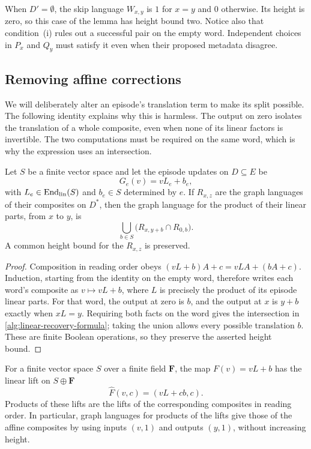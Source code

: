 When $D'=\emptyset$, the skip language $W_{x,y}$ is $1$ for $x=y$
and $0$ otherwise. Its height is zero, so this case of the lemma has
height bound two. Notice also that condition~\textup{(i)} rules out a
successful pair on the empty word. Independent choices in $P_x$ and
$Q_y$ must satisfy it even when their proposed metadata disagree.

\subsection{Removing affine corrections}

We will deliberately alter an episode's translation term to make its
split possible. The following identity explains why this is harmless.
The output on zero isolates the translation of a whole composite, even
when none of its linear factors is invertible. The two computations must
be required on the same word, which is why the expression uses an
intersection.

\begin{lemma}\label{alg:affine-recovery}
Let $S$ be a finite vector space and let the episode updates on
$D\subseteq E$ be
\[
                          G_e(v)=vL_e+b_e,
\]
with $L_e\in\operatorname{End}_{\rm lin}(S)$ and $b_e\in S$ determined
by $e$. If $R_{x,z}$ are the graph languages of their composites on
$D^*$, then the graph language for the product of their linear parts,
from $x$ to $y$, is
\begin{equation}\label{alg:linear-recovery-formula}
                  \bigcup_{b\in S}
                         \bigl(R_{x,y+b}\cap R_{0,b}\bigr).
\end{equation}
A common height bound for the $R_{x,z}$ is preserved.
\end{lemma}

\begin{proof}
Composition in reading order obeys
$(vL+b)A+c=vLA+(bA+c)$. Induction, starting from the identity on the
empty word, therefore writes each word's composite as $v\mapsto vL+b$,
where $L$ is precisely the product of its episode linear parts.
For that word, the output at zero is $b$, and the output at $x$ is
$y+b$ exactly when $xL=y$. Requiring both facts on the word gives the
intersection in \eqref{alg:linear-recovery-formula}; taking the union
allows every possible translation $b$. These are finite Boolean
operations, so they preserve the asserted height bound.
\end{proof}

\begin{lemma}\label{alg:homogeneous-lift}
For a finite vector space $S$ over a finite field $\mathbf F$, the map
$F(v)=vL+b$ has the linear lift on $S\oplus\mathbf F$
\begin{equation}\label{alg:lift-formula}
                     \widehat F(v,c)=(vL+cb,c).
\end{equation}
Products of these lifts are the lifts of the corresponding composites
in reading order. In particular, graph languages for products of the
lifts give those of the affine composites by using inputs $(v,1)$
and outputs $(y,1)$, without increasing height.
\end{lemma}

